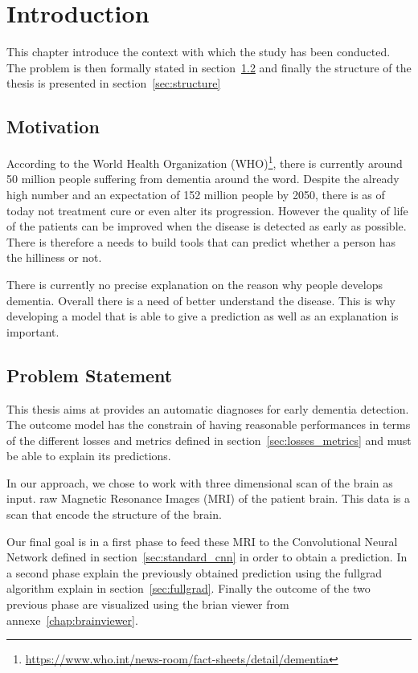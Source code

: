 \chapter{Introduction}
This chapter introduce the context with which the study has been conducted. The problem is then formally stated in section~\ref{sec:problem_statement} and finally the structure of the thesis is presented in section~\ref{sec:structure} 



\section{Motivation}
\label{sec:motivation}
According to the World Health Organization (WHO)\footnote{\href{https://www.who.int/news-room/fact-sheets/detail/dementia}{https://www.who.int/news-room/fact-sheets/detail/dementia}}, there is currently around 50 million people suffering from dementia around the word. Despite the already high number and an expectation of 152 million people by 2050, there is as of today not treatment cure or even alter its progression. However the quality of life of the patients can be improved when the disease is detected as early as possible. There is therefore a needs to build tools that can predict whether a person has the hilliness or not.

There is currently no precise explanation on the reason why people develops dementia. Overall  there is a need of better understand the disease. This is why developing a model that is able to give a prediction as well as an explanation is important.  


\section{Problem Statement}
\label{sec:problem_statement}
This thesis aims at provides an automatic diagnoses for early dementia detection. The outcome model has the constrain of having reasonable performances in terms of the different losses and metrics defined in section~\ref{sec:losses_metrics} and must be able to explain its predictions.

In our approach, we chose to work with three dimensional scan of the brain as input.   raw Magnetic Resonance Images (MRI) of the patient brain. This data is a scan that encode the structure of the brain. 

Our final goal is in a first phase to feed these MRI to the Convolutional Neural Network defined in section~\ref{sec:standard_cnn} in order to obtain a prediction. In a second phase explain the previously obtained prediction using the fullgrad algorithm explain in section~\ref{sec:fullgrad}. Finally the outcome of the two previous phase are visualized using the brian viewer from annexe~\ref{chap:brainviewer}.



